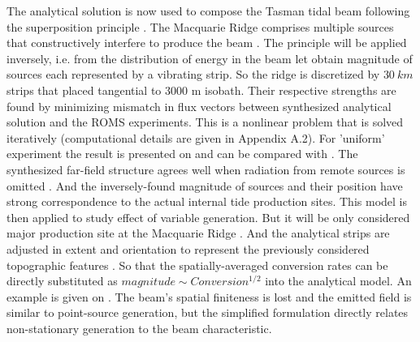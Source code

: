\documentclass[12pt]{article}
\begin{document}
The analytical solution is now used to compose the Tasman tidal beam following the superposition 
principle \citep{rainville2010interference}. The Macquarie Ridge comprises multiple sources 
that constructively interfere to produce the beam \citep{klymak2016reflection}. The principle will 
be applied inversely, i.e. from the distribution of energy in the beam let obtain 
magnitude of sources each represented by a vibrating strip. So the ridge is discretized by $30~km$ 
strips that placed tangential to $3000$ m isobath. Their respective strengths are 
found by minimizing mismatch in flux vectors between synthesized analytical solution and the ROMS 
experiments. This is a nonlinear problem that is solved iteratively (computational details are 
given in Appendix A.2). For 'uniform' experiment the result is presented on  
and can be compared with . The synthesized far-field structure agrees well when 
radiation from remote sources is omitted .  And the 
inversely-found magnitude of sources and their position have strong correspondence to the actual 
internal tide production sites. This model is then applied to study effect of variable generation. 
But it will be only considered major production site at the Macquarie Ridge 
. And the analytical strips are adjusted in extent and orientation to 
represent the previously considered topographic features . So that the 
spatially-averaged conversion rates can be directly substituted as $magnitude \sim 
Conversion^{1/2}$ into the analytical model. An example is given on . 
The beam's spatial finiteness is lost and the emitted field is similar to point-source generation, 
but the simplified formulation directly relates non-stationary generation to the beam 
characteristic.\\
\end{document}
